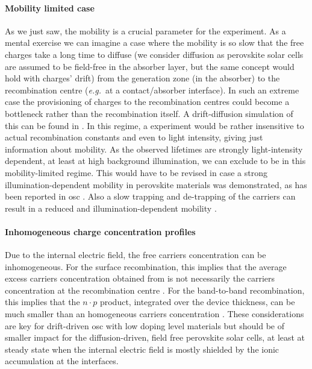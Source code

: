 		\paragraph{Mobility limited case}\label{tpv_mobility}
		As we just saw, the mobility is a crucial parameter for the  experiment.
		As a mental exercise we can imagine a case where the mobility is so slow that the free charges take a long time to diffuse (we consider diffusion as perovskite solar cells are assumed to be field\hyp{}free in the absorber layer, but the same concept would hold with charges' drift) from the generation zone (in the absorber) to the recombination centre (\textsl{e.g.}\ at a contact/absorber interface).
		In such an extreme case the provisioning of charges to the recombination centres could become a bottleneck rather than the recombination itself.
		A drift\hyp{}diffusion simulation of this can be found in .
		In this regime, a  experiment would be rather insensitive to actual recombination constants and even to light intensity, giving just information about mobility.
		As the observed  lifetimes are strongly light\hyp{}intensity dependent, at least at high background illumination, we can exclude to be in this mobility\hyp{}limited regime.
		This would have to be revised in case a strong illumination\hyp{}dependent mobility in perovskite materials was demonstrated, as has been reported in \gls{osc} \cite{Eng2010,Shuttle2010,Deledalle2014}.
		Also a slow trapping and de\hyp{}trapping of the carriers can result in a reduced and illumination\hyp{}dependent mobility \cite{Du2018}.

		\paragraph{Inhomogeneous charge concentration profiles}
		Due to the internal electric field, the free carriers concentration can be inhomogeneous.
		For the surface recombination, this implies that the average excess carriers concentration obtained from  is not necessarily the carriers concentration at the recombination centre \cite{Kirchartz2012}.
		For the band\hyp{}to\hyp{}band recombination, this implies that the $n \cdot p$ product, integrated over the device thickness, can be much smaller than an homogeneous carriers concentration \cite{Deibel2009}.
		These considerations are key for drift\hyp{}driven \gls{osc} with low doping level materials \cite{Deledalle2015,Deledalle2014} but should be of smaller impact for the diffusion\hyp{}driven, field free perovskite solar cells, at least at steady state when the internal electric field is mostly shielded by the ionic accumulation at the interfaces.

